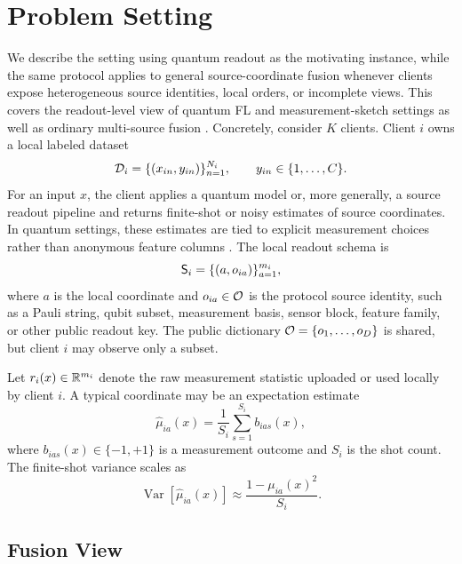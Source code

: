 \section{Problem Setting}

We describe the setting using quantum readout as the motivating instance, while the same protocol applies to general source-coordinate fusion whenever clients expose heterogeneous source identities, local orders, or incomplete views. This covers the readout-level view of quantum FL and measurement-sketch settings as well as ordinary multi-source fusion \cite{ren2025towardqfl,huang2020classicalshadows,hadfield2022locallybiased,castanedo2013datafusion}. Concretely, consider \(K\) clients. Client \(i\) owns a local labeled dataset
\begin{equation}
    \mathcal{D}_i=\{(x_{in},y_{in})\}_{n=1}^{N_i}, \qquad y_{in}\in\{1,\ldots,C\}.
\end{equation}
For an input \(x\), the client applies a quantum model or, more generally, a source readout pipeline and returns finite-shot or noisy estimates of source coordinates. In quantum settings, these estimates are tied to explicit measurement choices rather than anonymous feature columns \cite{havlicek2019supervised,schuld2019feature,huang2020classicalshadows}. The local readout schema is
\begin{equation}
    \mathsf{S}_i = \{(a,o_{ia})\}_{a=1}^{m_i},
\end{equation}
where \(a\) is the local coordinate and \(o_{ia}\in\mathcal{O}\) is the protocol source identity, such as a Pauli string, qubit subset, measurement basis, sensor block, feature family, or other public readout key. The public dictionary \(\mathcal{O}=\{o_1,\ldots,o_D\}\) is shared, but client \(i\) may observe only a subset.

Let \(r_i(x)\in\mathbb{R}^{m_i}\) denote the raw measurement statistic uploaded or used locally by client \(i\). A typical coordinate may be an expectation estimate
\begin{equation}
    \hat{\mu}_{ia}(x)=\frac{1}{S_i}\sum_{s=1}^{S_i} b_{ias}(x),
\end{equation}
where \(b_{ias}(x)\in\{-1,+1\}\) is a measurement outcome and \(S_i\) is the shot count. The finite-shot variance scales as
\begin{equation}
    \operatorname{Var}[\hat{\mu}_{ia}(x)] \approx \frac{1-\mu_{ia}(x)^2}{S_i}.
\end{equation}

\subsection{Fusion View}

